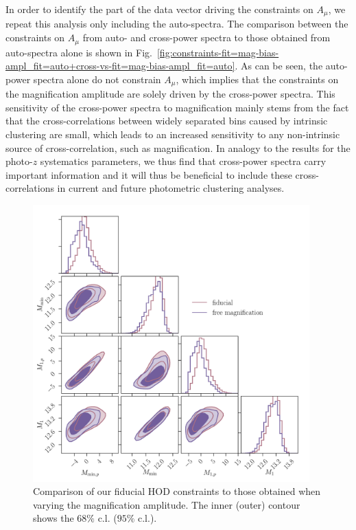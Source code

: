 \documentclass[a4paper,11pt]{article}
\begin{document}
    In order to identify the part of the data vector driving the constraints on $A_{\mu}$, we repeat this analysis only including the auto-spectra. The comparison between the constraints on $A_{\mu}$ from auto- and cross-power spectra to those obtained from auto-spectra alone is shown in Fig.~\ref{fig:constraints-fit=mag-bias-ampl_fit=auto+cross-vs-fit=mag-bias-ampl_fit=auto}. As can be seen, the auto-power spectra alone do not constrain $A_{\mu}$, which implies that the constraints on the magnification amplitude are solely driven by the cross-power spectra. This sensitivity of the cross-power spectra to magnification mainly stems from the fact that the cross-correlations between widely separated bins caused by intrinsic clustering are small, which leads to an increased sensitivity to any non-intrinsic source of cross-correlation, such as magnification. In analogy to the results for the photo-$z$ systematics parameters, we thus find that cross-power spectra carry important information and it will thus be beneficial to include these cross-correlations in current and future photometric clustering analyses. 

    \begin{figure}
      \begin{center}
        \includegraphics[width=0.95\textwidth]{figures/contours-Mmin-M1_mPk=HOD_fix=alpha-fc-sigmaM_HOD=zevol_fit=pz-shifts+prior=0p2-pz-widths+prior=0p2_fit=auto+cross_cosmo=const-LINBIAS_HOD-param=zfid_clfit=HOD-zevol_no-mag-bias-vs-mag-bias-free.pdf}
        \caption{Comparison of our fiducial HOD constraints to those obtained when varying the magnification amplitude. The inner (outer) contour shows the $68 \%$ c.l. ($95 \%$ c.l.).}
        \label{fig:constraints-no-mag-bias-vs-fit=mag-bias-ampl}
      \end{center}
    \end{figure}
\end{document}
